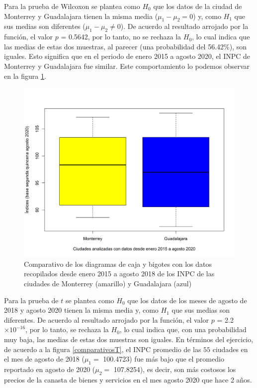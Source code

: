 \documentclass{article}
\begin{document}
Para la prueba de Wilcoxon se plantea como $H_{0}$ que los datos de la ciudad de Monterrey y Guadalajara tienen la misma media ($\mu_{1} - \mu_{2} = 0 $) y, como $H_{1}$ que sus medias son diferentes ($\mu_{1} - \mu_{2} \neq 0 $). De acuerdo al resultado arrojado por la función, el valor $p$ = 0.5642, por lo tanto, no se rechaza la $H_{0}$, lo cual indica que las medias de estas dos muestras, al parecer (una probabilidad del 56.42\%), son iguales. Esto significa que en el periodo de enero 2015 a agosto 2020, el INPC de Monterrey y Guadalajara fue similar. Este comportamiento lo podemos observar en la figura \ref{comparativoW}.
    
\begin{figure}
\centering
\includegraphics[scale=0.5]{Figures/comparativosW.png}
\caption{Comparativo de los diagramas de caja y bigotes con los  datos recopilados desde enero 2015 a agosto 2018 de los INPC de las ciudades de Monterrey (amarillo) y Guadalajara (azul)}
\label{comparativoW}
\end{figure}
    
Para la prueba de $t$ se plantea como $H_{0}$ que los datos de los meses de agosto de 2018 y agosto 2020 tienen la misma media y, como $H_{1}$ que sus medias son diferentes. De acuerdo al resultado arrojado por la función, el valor $p$ = 2.2$\times 10^{-16}$, por lo tanto, se rechaza la $H_{0}$, lo cual indica que, con una probabilidad muy baja, las medias de estas dos muestras son iguales. En términos del ejercicio, de acuerdo a la figura \ref{comparativosT}, el INPC promedio de las $55$ ciudades en el mes de agosto de 2018 ($\mu_{1}=$ 100.4723) fue más bajo que el promedio reportado en agosto de 2020 ($\mu_{2}=$ 107.8254), es decir, son más costosos los precios de la canasta de bienes y servicios en el mes agosto 2020 que hace 2 años.
\end{document}
